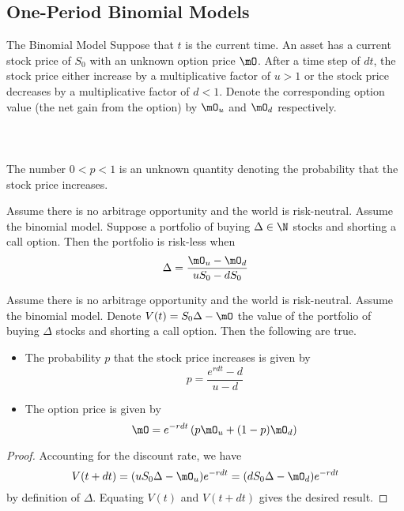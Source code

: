 \documentclass[a4paper]{article}
\begin{document}
\subsection{One-Period Binomial Models}
\begin{defn}{The Binomial Model}{} Suppose that $t$ is the current time. An asset has a current stock price of $S_0$ with an unknown option price $\mO$. After a time step of $dt$, the stock price either increase by a multiplicative factor of $u>1$ or the stock price decreases by a multiplicative factor of $d<1$. Denote the corresponding option value (the net gain from the option) by $\mO_u$ and $\mO_d$ respectively. \\~\\
 \\~\\
The number $0<p<1$ is an unknown quantity denoting the probability that the stock price increases. 
\end{defn}

\begin{lmm}{}{} Assume there is no arbitrage opportunity and the world is risk-neutral. Assume the binomial model. Suppose a portfolio of buying $\Delta\in\N$ stocks and shorting a call option. Then the portfolio is risk-less when $$\Delta=\frac{\mO_u-\mO_d}{uS_0-dS_0}$$
\end{lmm}

\begin{prp}{}{} Assume there is no arbitrage opportunity and the world is risk-neutral. Assume the binomial model. Denote $V(t)=S_0\Delta-\mO$ the value of the portfolio of buying $\Delta$ stocks and shorting a call option. Then the following are true. 
\begin{itemize}
\item The probability $p$ that the stock price increases is given by $$p=\frac{e^{rdt}-d}{u-d}$$
\item The option price is given by $$\mO=e^{-rdt}\left(p\mO_u+(1-p)\mO_d\right)$$
\end{itemize} \tcbline
\begin{proof}
Accounting for the discount rate, we have $$V(t+dt)=(uS_0\Delta-\mO_u)e^{-rdt}=(dS_0\Delta-\mO_d)e^{-rdt}$$ by definition of $\Delta$. Equating $V(t)$ and $V(t+dt)$ gives the desired result. 
\end{proof}
\end{prp}
\end{document}
